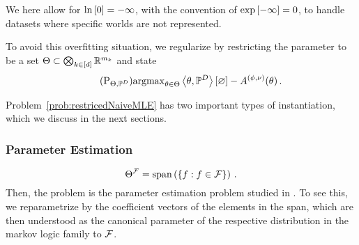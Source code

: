 We here allow for $\ln \left[ 0 \right]=-\infty$, with the convention of $\mathrm{exp}\left[-\infty\right]=0$, to handle datasets where specific worlds are not represented. 


To avoid this overfitting situation, we regularize by restricting the parameter to be a set $\Theta\subset\bigotimes_{k\in[d]} \mathbb{R}^{m_{k}}$ and state
\begin{align}\tag{$\mathrm{P}_{\energyhypothesis, \empdistribution}$}\label{prob:restrictedNaiveMLE}
	\argmax_{\canparam\in\energyhypothesis}  \sbcontraction{\canparam,\empdistribution} - \cumfunctionof{\canparam} \, . 
\end{align}

Problem~\ref{prob:restricedNaiveMLE} has two important types of instantiation, which we discuss in the next sections.

\subsubsection{Parameter Estimation}

	\[ \Theta^{\mathcal{F}} = \mathrm{span}\left(\{f : f\in\mathcal{F} \}\right) \, . \]
Then, the problem is the parameter estimation problem studied in .
To see this, we reparametrize by the coefficient vectors of the elements in the span, which are then understood as the canonical parameter of the respective distribution in the markov logic family to $\mathcal{F}$.


